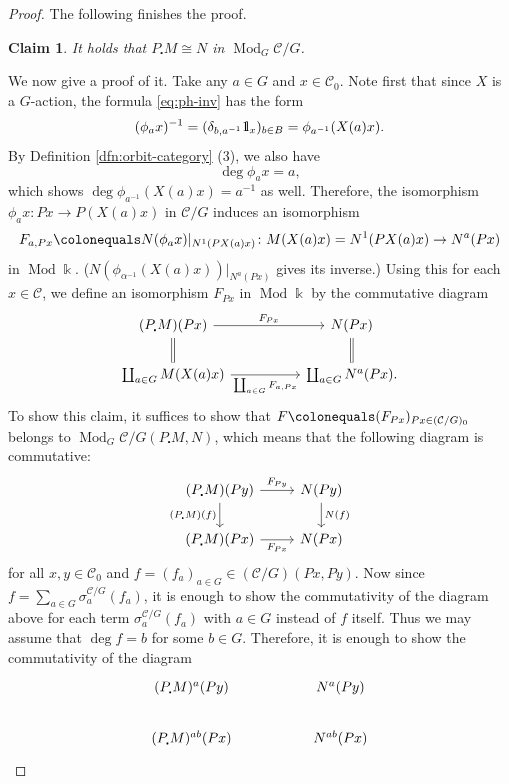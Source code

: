\documentclass{surv-l}
\numberwithin{equation}{chapter}
\numberwithin{figure}{chapter}
\theoremstyle{plain}
\newtheorem{clm}{Claim}
\theoremstyle{definition}
\theoremstyle{remark}
\newcommand{\id}{1\kern-.25em{\text{{\rm l}}}}
\newcommand{\Ar}[3]{\ar[from={#1}, to={#2}, #3]}
\DeclareMathOperator{\Mod}{Mod}
\begin{document}
\begin{proof}
The following finishes the proof.
\begin{clm}
It holds that $P_{\centerdot} M \cong N$ in $\Mod_{G}{\mathcal{C}}/G$.
\end{clm}
We now give a proof of it.
Take any $a\in G$ and $x \in {\mathcal{C}}_0$.
Note first that since $X$ is a $G$-action, the formula \eqref{eq:ph-inv} has the form
\[
(\phi_ax)^{-1} = (\delta_{b,a^{-1}} \id_x)_{b \in B} = \phi_{a^{-1}}(X(a)x).
\]
By Definition \ref{dfn:orbit-category} (3), we also have
\[
\deg \phi_{a}x =a,
\]
which shows
$\deg \phi_{a^{-1}}(X(a)x) \!=\! a^{-1}$ as well.
Therefore, the isomorphism $\phi_ax \colon\! Px\! \to P(X(a)x)$ in ${\mathcal{C}}/G$
induces an isomorphism
\[
F_{a,P x}\colonequals 
N(\phi_{a}x)|_{N^1(PX(a)x)}\colon M(X(a) x)=N^1(PX(a) x) \to N^{a}(P x)
\]
in $\Mod \Bbbk$.
($N(\phi_{\alpha^{-1}}(X(a)x))|_{N^{a}(P x)}$ gives its inverse.)
Using this for each $x \in {\mathcal{C}}$, we define an isomorphism $F_{P x}$
in $\Mod \Bbbk$ by the commutative diagram
\[
\begin{tikzcd}[column sep=5em]
(P_{\centerdot} M)(P x) & N(P x)\\
\coprod_{a \in G} M(X(a) x) & \coprod_{a\in G} N^{a}(P x).
\Ar{1-1}{1-2}{"F_{P x}"}
\Ar{2-1}{2-2}{"{\coprod_{a\in G}F_{a,P x}}" '}
\Ar{1-1}{2-1}{equal}
\Ar{1-2}{2-2}{equal}
\end{tikzcd}
\]
To show this claim, it suffices to show that
$F\colonequals (F_{P x})_{P x \in ({\mathcal{C}}/G)_0}$ belongs to $\Mod_{G}{\mathcal{C}}/G(P_{\centerdot} M, N)$,
which means that the following diagram is commutative:
\[
\begin{tikzcd}
(P_{\centerdot} M)(P y) & N(P y)\\
(P_{\centerdot} M)(P x) & N(P x)
\Ar{1-1}{1-2}{"F_{P y}"}
\Ar{2-1}{2-2}{"F_{P x}" '}
\Ar{1-1}{2-1}{"(P_{\centerdot} M)(f)" '}
\Ar{1-2}{2-2}{"N(f)"}
\end{tikzcd}
\]
for all $x, y \!\in\! {\mathcal{C}}_0$ and $f \!=\!(f_a)_{a\in G}\!\in\! ({\mathcal{C}}/G)(Px, Py)$.
Now since $f \!=\! \sum_{a \in G} \sigma_a^{{\mathcal{C}}/G}(f_a)$, it is enough to show the commutativity
of the diagram above for each term $\sigma_a^{{\mathcal{C}}/G}(f_a)$ with $a\in G$
instead of $f$ itself.
Thus we may assume that $\deg f = b$ for some $b \in G$.
Therefore, it is enough to show the commutativity of the diagram
\begin{equation}\label{eq:F-morph}
\begin{tikzcd}[column sep=5em]
(P_{\centerdot} M)^a(P y) & N^a(P y)\\
(P_{\centerdot} M)^{ab}(P x) & N^{ab}(P x)

\end{tikzcd}
\end{equation}
\end{proof}
\end{document}
